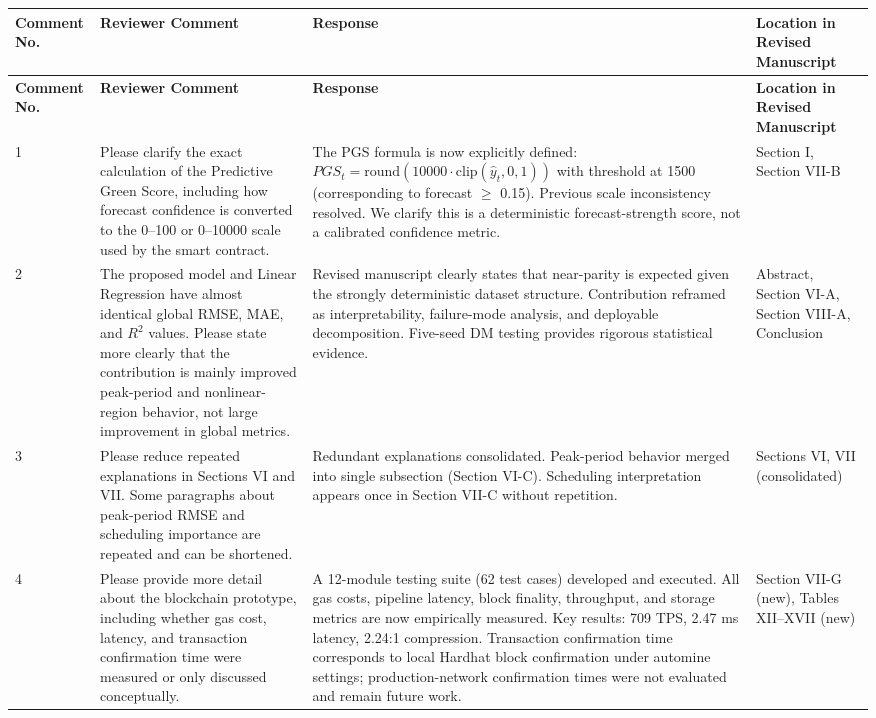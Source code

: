 \documentclass[11pt,a4paper]{article}
\begin{document}
\begin{longtable}{|p{1.5cm}|p{3.5cm}|p{6.2cm}|p{2.8cm}|}
\hline
\textbf{Comment No.} & \textbf{Reviewer Comment } & \textbf{Response} & \textbf{Location in Revised Manuscript} \\
\hline
\endfirsthead
\hline
\textbf{Comment No.} & \textbf{Reviewer Comment } & \textbf{Response} & \textbf{Location in Revised Manuscript} \\
\hline
\endhead

1 & Please clarify the exact calculation of the Predictive Green Score, including how forecast confidence is converted to the 0--100 or 0--10000 scale used by the smart contract. & The PGS formula is now explicitly defined: $PGS_t = \text{round}(10000 \cdot \text{clip}(\hat{y}_t, 0, 1))$ with threshold at 1500 (corresponding to forecast $\ge$ 0.15). Previous scale inconsistency resolved. We clarify this is a deterministic forecast-strength score, not a calibrated confidence metric. & Section I, Section VII-B \\
\hline

2 & The proposed model and Linear Regression have almost identical global RMSE, MAE, and $R^2$ values. Please state more clearly that the contribution is mainly improved peak-period and nonlinear-region behavior, not large improvement in global metrics. & Revised manuscript clearly states that near-parity is expected given the strongly deterministic dataset structure. Contribution reframed as interpretability, failure-mode analysis, and deployable decomposition. Five-seed DM testing provides rigorous statistical evidence. & Abstract, Section VI-A, Section VIII-A, Conclusion \\
\hline

3 & Please reduce repeated explanations in Sections VI and VII. Some paragraphs about peak-period RMSE and scheduling importance are repeated and can be shortened. & Redundant explanations consolidated. Peak-period behavior merged into single subsection (Section VI-C). Scheduling interpretation appears once in Section VII-C without repetition. & Sections VI, VII (consolidated) \\
\hline

4 & Please provide more detail about the blockchain prototype, including whether gas cost, latency, and transaction confirmation time were measured or only discussed conceptually. & A 12-module testing suite (62 test cases) developed and executed. All gas costs, pipeline latency, block finality, throughput, and storage metrics are now empirically measured. Key results: 709 TPS, 2.47 ms latency, 2.24:1 compression. Transaction confirmation time corresponds to local Hardhat block confirmation under automine settings; production-network confirmation times were not evaluated and remain future work. & Section VII-G (new), Tables XII--XVII (new) \\
\hline

\end{longtable}
\end{document}
